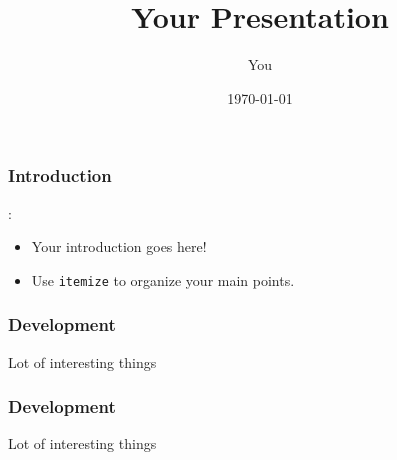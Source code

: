 \documentclass{beamer}              %
\title[Your Short Title]{Your Presentation}
\author{You}
\date{\today}
\begin{document}
\begin{frame}
  \titlepage
\end{frame}

\begin{frame}
    \frametitle{Introduction}:

\begin{itemize}
  \item Your introduction goes here!
  \item Use \texttt{itemize} to organize your main points.
\end{itemize}

\end{frame}

\begin{frame}
    \frametitle{Development}

    Lot of interesting things

\end{frame}


\begin{frame}
    \frametitle{Development}

    Lot of interesting things

\end{frame}
\end{document}
